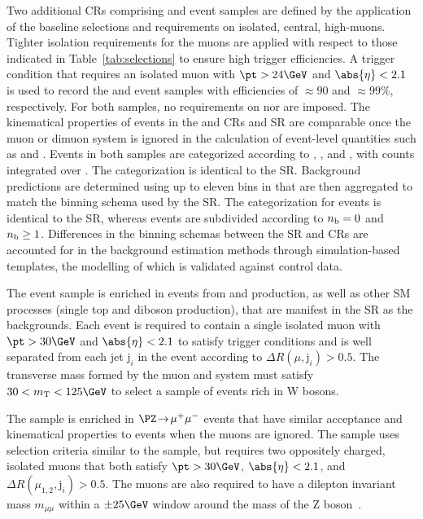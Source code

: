 Two additional CRs comprising \mj and \mmj event samples are defined
by the application of the baseline selections and requirements on
isolated, central, high-\pt muons. Tighter isolation requirements for
the muons are applied with respect to those indicated in
Table~\ref{tab:selections} to ensure high trigger efficiencies. A
trigger condition that requires an isolated muon with $\pt > 24\GeV$
and $\abs{\eta} < 2.1$ is used to record the \mj and \mmj event
samples with efficiencies of ${\approx}90$ and ${\approx}99\%$,
respectively. For both samples, no requirements on \alphat nor \bdphi
are imposed. The kinematical properties of events in the \mj and \mmj
CRs and SR are comparable once the muon or dimuon system is ignored in
the calculation of event-level quantities such as \scalht and \mht.
Events in both samples are categorized according to \njet, \scalht,
and \nb, with counts integrated over \mht. The \njet categorization is
identical to the SR. Background predictions are determined using up to
eleven bins in \scalht that are then aggregated to match the \scalht
binning schema used by the SR. The \nb categorization for \mj events
is identical to the SR, whereas \mmj events are subdivided according
to $n_{\mathrm{b}} = 0$ and $n_{\mathrm{b}} \geq 1$. Differences in the binning schemas
between the SR and CRs are accounted for in the background estimation
methods through simulation-based templates, the modelling of which is
validated against control data.

The \mj event sample is enriched in events from \wmj and \ttbar
production, as well as other SM processes (\eg single top and diboson
production), that are manifest in the SR as the \lost
backgrounds. Each event is required to contain a single isolated muon
with $\pt > 30\GeV$ and $\abs{\eta} < 2.1$ to satisfy trigger
conditions and is well separated from each jet $\text{j}_i$ in the
event according to ${\Delta}R(\mu,\text{j}_i) > 0.5$. The transverse
mass formed by the muon \pt and \ptvecmiss system must satisfy $30 <
m_\text{T} < 125\GeV$ to select a sample of events rich in W bosons.

The \mmj sample is enriched in $\PZ\! \rightarrow\!  \mu^+\mu^-$
events that have similar acceptance and kinematical properties to
\znunuj events when the muons are ignored. The sample uses selection
criteria similar to the \mj sample, but requires two oppositely
charged, isolated muons that both satisfy $\pt > 30\GeV$, $\abs{\eta}
< 2.1$, and ${\Delta}R(\mu_{1,2},\text{j}_i) > 0.5$. The muons are
also required to have a dilepton invariant mass $m_{\mu\mu}$ within a
${\pm}25\GeV$ window around the mass of the Z
boson~\cite{1674-1137-38-9-090001}.

